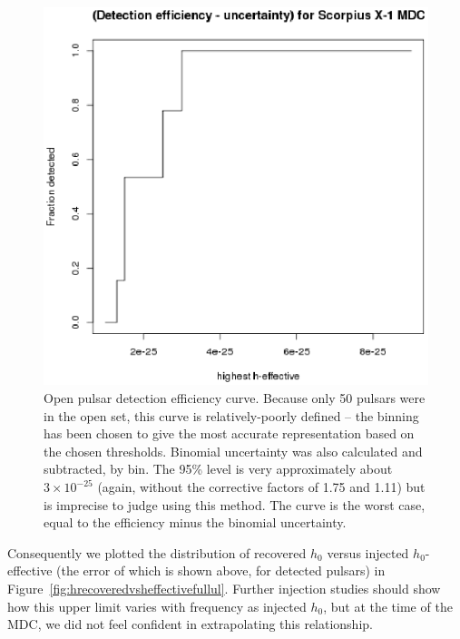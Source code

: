 \begin{figure}
\begin{center}
\includegraphics[width=0.3\paperwidth,height=0.2\paperheight]{detectionVsHeffective.eps}
\caption{ Open pulsar detection efficiency curve.
Because only 50 pulsars were in the open set, this curve is relatively-poorly defined -- the binning has been chosen to give the most accurate representation based on the chosen thresholds.
Binomial uncertainty was also calculated and subtracted, by bin. The 95\% level is very approximately about $3 \times 10^{-25}$ (again, without the corrective factors of 1.75 and 1.11) but is imprecise to judge using this method.
The curve is the worst case, equal to the efficiency minus the binomial uncertainty.
\label{fig:detectionvsheffective}}
\end{center}
\end{figure}


Consequently we plotted the distribution of recovered $h_0$ versus injected $h_0$-effective (the error of which is shown above, for detected pulsars)  in Figure~\ref{fig:hrecoveredvsheffectivefullul}. Further injection studies should show how this upper limit varies with frequency as injected $h_0$, but at the time of the MDC, we did not feel confident in extrapolating this relationship.

